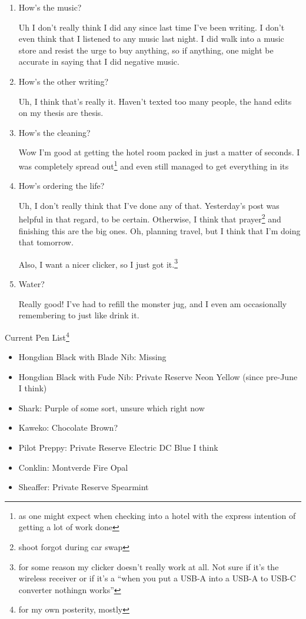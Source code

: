 \documentclass[12pt]{article}
\newcommand{\say}[1]{``#1''}
\renewcommand{\,}{\textsuperscript{,}}
\begin{document}
\begin{enumerate}
\item How's the music?

Uh I don't really think I did any since last time I've been writing.  
I don't even think that I listened to any music last night.  
I did walk into a music store and resist the urge to buy anything, so if anything, one might be accurate in saying that I did negative music.

\item How's the other writing?

Uh, I think that's really it. Haven't texted too many people, the hand edits on my thesis are thesis.

\item How's the cleaning?

Wow I'm good at getting the hotel room packed in just a matter of seconds.  
I was completely spread out\footnote{as one might expect when checking into a hotel with the express intention of getting a lot of work done} and even still managed to get everything in its

\item How's ordering the life?

Uh, I don't really think that I've done any of that.  
Yesterday's post was helpful in that regard, to be certain.  
Otherwise, I think that prayer\footnote{shoot forgot during car swap} and finishing this are the big ones.  
Oh, planning travel, but I think that I'm doing that tomorrow.

Also, I want a nicer clicker, so I just got it.\footnote{for some reason my clicker doesn't really work at all. Not sure if it's the wireless receiver or if it's a \say{when you put a USB-A into a USB-A to USB-C converter nothingn works}}

\item Water?

Really good! I've had to refill the monster jug, and I even am occasionally remembering to just like drink it.

\end{enumerate}

Current Pen List\footnote{for my own posterity, mostly}

\begin{itemize}

\item Hongdian Black with Blade Nib: Missing  
\item Hongdian Black with Fude Nib: Private Reserve Neon Yellow (since pre-June I think)  
\item Shark: Purple of some sort, unsure which right now  
\item Kaweko: Chocolate Brown?  
\item Pilot Preppy: Private Reserve Electric DC Blue I think  
\item Conklin: Montverde Fire Opal  
\item Sheaffer: Private Reserve Spearmint

\end{itemize}
\end{document}
